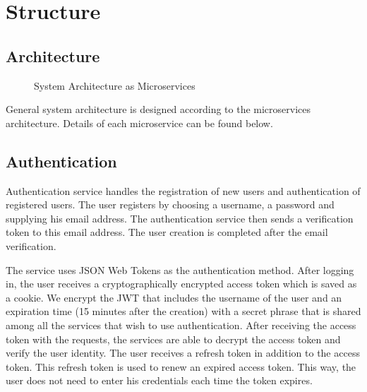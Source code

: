 \section{Structure}

\subsection{Architecture}
\begin{figure}[hb]
    \centering
    \caption{System Architecture as Microservices}
    \label{fig:microservices}
\end{figure}

General system architecture is designed according to the microservices architecture. Details of each microservice can be found below.

\subsection{Authentication}
Authentication service handles the registration of new users and authentication of registered users. The user registers by choosing a username, a password and supplying his email address. The authentication service then sends a verification token to this email address. The user creation is completed after the email verification.
\par The service uses JSON Web Tokens as the authentication method. After logging in, the user receives a cryptographically encrypted access token which is saved as a cookie. We encrypt the JWT that includes the username of the user and an expiration time (15 minutes after the creation) with a secret phrase that is shared among all the services that wish to use authentication. After receiving the access token with the requests, the services are able to decrypt the access token and verify the user identity. The user receives a refresh token in addition to the access token. This refresh token is used to renew an expired access token. This way, the user does not need to enter his credentials each time the token expires.

